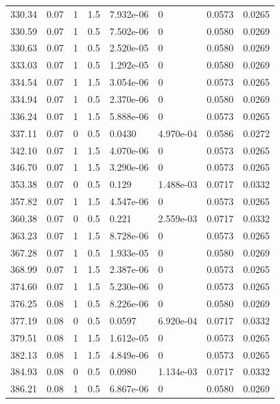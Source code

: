 \documentclass[preview]{standalone}
\begin{document}
{{{\begin{tabular}{L{1.2cm}C{1.2cm} C{0.3cm}C{0.5cm} C{1.4cm}C{1.4cm} C{1.4cm}C{1.4cm}}
  330.34  &  0.07  & 1     & 1.5 &  7.932e-06  & 0  & 0.0573 &  0.0265   \\ 
  330.59  &  0.07  & 1     & 0.5 &  7.502e-06  & 0  & 0.0580 &  0.0269   \\ 
  330.63  &  0.07  & 1     & 0.5 &  2.520e-05  & 0  & 0.0580 &  0.0269   \\ 
  333.03  &  0.07  & 1     & 0.5 &  1.292e-05  & 0  & 0.0580 &  0.0269   \\ 
  334.54  &  0.07  & 1     & 1.5 &  3.054e-06  & 0  & 0.0573 &  0.0265   \\ 
  334.94  &  0.07  & 1     & 0.5 &  2.370e-06  & 0  & 0.0580 &  0.0269   \\ 
  336.24  &  0.07  & 1     & 1.5 &  5.888e-06  & 0  & 0.0573 &  0.0265   \\ 
  337.11  &  0.07  & 0     & 0.5 &  0.0430  & 4.970e-04  & 0.0586 &  0.0272   \\ 
  342.10  &  0.07  & 1     & 1.5 &  4.070e-06  & 0  & 0.0573 &  0.0265   \\ 
  346.70  &  0.07  & 1     & 1.5 &  3.290e-06  & 0  & 0.0573 &  0.0265   \\ 
  353.38  &  0.07  & 0     & 0.5 &  0.129  & 1.488e-03  & 0.0717 &  0.0332   \\ 
  357.82  &  0.07  & 1     & 1.5 &  4.547e-06  & 0  & 0.0573 &  0.0265   \\ 
  360.38  &  0.07  & 0     & 0.5 &  0.221  & 2.559e-03  & 0.0717 &  0.0332   \\ 
  363.23  &  0.07  & 1     & 1.5 &  8.728e-06  & 0  & 0.0573 &  0.0265   \\ 
  367.28  &  0.07  & 1     & 0.5 &  1.933e-05  & 0  & 0.0580 &  0.0269   \\ 
  368.99  &  0.07  & 1     & 1.5 &  2.387e-06  & 0  & 0.0573 &  0.0265   \\ 
  374.60  &  0.07  & 1     & 1.5 &  5.230e-06  & 0  & 0.0573 &  0.0265   \\ 
  376.25  &  0.08  & 1     & 0.5 &  8.226e-06  & 0  & 0.0580 &  0.0269   \\ 
  377.19  &  0.08  & 0     & 0.5 &  0.0597  & 6.920e-04  & 0.0717 &  0.0332   \\ 
  379.51  &  0.08  & 1     & 1.5 &  1.612e-05  & 0  & 0.0573 &  0.0265   \\ 
  382.13  &  0.08  & 1     & 1.5 &  4.849e-06  & 0  & 0.0573 &  0.0265   \\ 
  384.93  &  0.08  & 0     & 0.5 &  0.0980  & 1.134e-03  & 0.0717 &  0.0332   \\ 
  386.21  &  0.08  & 1     & 0.5 &  6.867e-06  & 0  & 0.0580 &  0.0269   \\ 

\end{tabular}}}}
\end{document}
